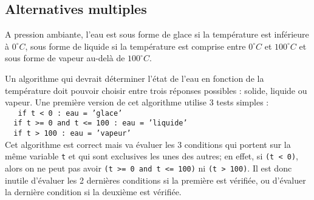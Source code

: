 \subsection{Alternatives multiples}\label{sub:alternatives}
\begin{ex}
A pression ambiante, l'eau est sous forme de glace si la température
est inférieure à $0^\circ C$, sous forme de liquide si la température
est comprise entre $0^\circ C$ et $100^\circ C$ et sous forme de vapeur
au-delà de $100^\circ C$.
\end{ex}
\noindent Un algorithme qui devrait déterminer l'état de l'eau en fonction de
la température doit pouvoir choisir entre trois réponses possibles :
solide, liquide ou vapeur. Une première version de cet algorithme utilise
3 tests simples :\\
{\footnotesize\tt
\mbox{}\ \ if t < 0 : eau = 'glace'\\
\mbox{}\ \ if t >= 0 and t <= 100 : eau = 'liquide'\\
\mbox{}\ \ if t > 100 : eau = 'vapeur'\\
}
Cet algorithme est correct mais va évaluer les 3 conditions 
qui portent sur la même variable
{\tt t} et qui sont exclusives les unes des autres; en effet, si {\tt (t < 0)}, alors
on ne peut pas avoir {\tt (t >= 0 and t <= 100)} ni {\tt (t > 100)}. 
Il est donc inutile d'évaluer les 2 dernières conditions si la première 
est vérifiée, ou d'évaluer la dernière condition si la deuxième est vérifiée.
